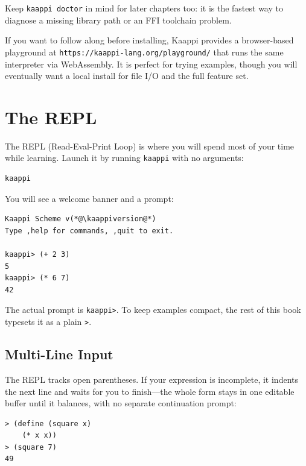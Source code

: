 Keep \texttt{kaappi doctor} in mind for later chapters too: it is the fastest way to diagnose a missing library path or an FFI toolchain problem.

\begin{note}
If you want to follow along before installing, Kaappi provides a browser-based playground at \texttt{https://kaappi-lang.org/\allowbreak playground/} that runs the same interpreter via WebAssembly. It is perfect for trying examples, though you will eventually want a local install for file I/O and the full feature set.
\end{note}

\section{The REPL}

The REPL (Read-Eval-Print Loop) is where you will spend most of your time while learning. Launch it by running \texttt{kaappi} with no arguments:

\begin{Verbatim}[fontsize=\small]
kaappi
\end{Verbatim}

You will see a welcome banner and a prompt:

\begin{lstlisting}[style=repl]
Kaappi Scheme v(*@\kaappiversion@*)
Type ,help for commands, ,quit to exit.

kaappi> (+ 2 3)
5
kaappi> (* 6 7)
42
\end{lstlisting}

\begin{note}
The actual prompt is \texttt{kaappi>}. To keep examples compact, the rest of this book typesets it as a plain \texttt{>}.
\end{note}

\subsection{Multi-Line Input}

The REPL tracks open parentheses. If your expression is incomplete, it indents the next line and waits for you to finish---the whole form stays in one editable buffer until it balances, with no separate continuation prompt:

\begin{lstlisting}[style=repl]
> (define (square x)
    (* x x))
> (square 7)
49
\end{lstlisting}

